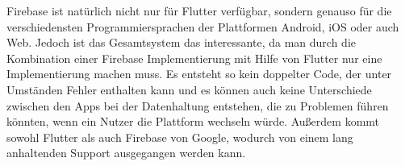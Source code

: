 Firebase ist natürlich nicht nur für Flutter verfügbar, sondern genauso für die verschiedensten Programmiersprachen der Plattformen Android, iOS oder auch Web. Jedoch ist das Gesamtsystem das interessante, da man durch die Kombination einer Firebase Implementierung mit Hilfe von Flutter nur eine Implementierung machen muss. Es entsteht so kein doppelter Code, der unter Umständen Fehler enthalten kann und es können auch keine Unterschiede zwischen den Apps bei der Datenhaltung entstehen, die zu Problemen führen könnten, wenn ein Nutzer die Plattform wechseln würde. Außerdem kommt sowohl Flutter als auch Firebase von Google, wodurch von einem lang anhaltenden Support ausgegangen werden kann.  